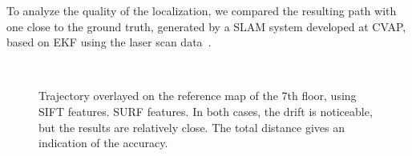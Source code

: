 \clearpage
To analyze the quality of the localization, we compared the resulting path with one close to the ground truth, generated by a \gls{SLAM} system developed at \gls{CVAP}, based on \gls{EKF} using the laser scan data~\cite{Folkesson_07}.
\begin{figure}[H]
\centering
{} \\
\caption{Trajectory overlayed on the reference map of the 7th floor, using \protect{} SIFT features. \protect{} SURF features. In both cases, the drift is noticeable, but the results are relatively close. The total distance gives an indication of the accuracy.}
\label{fig:plan_cvap}
\end{figure}

